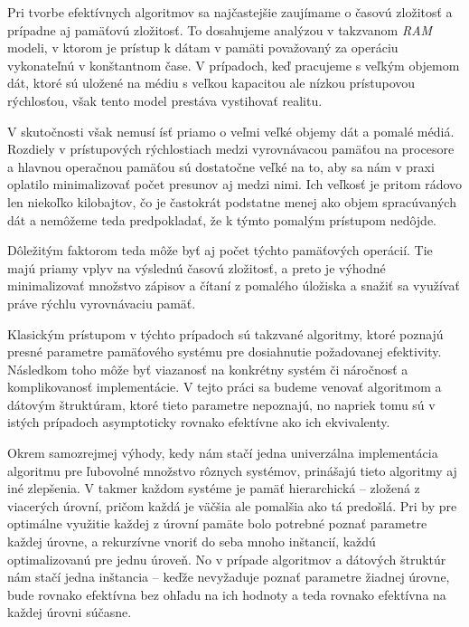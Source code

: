 
Pri tvorbe efektívnych algoritmov sa najčastejšie zaujímame o časovú zložitosť a prípadne aj pamäťovú zložitosť. To dosahujeme analýzou v takzvanom \emph{RAM} modeli, v ktorom je prístup k dátam v pamäti považovaný za operáciu vykonateľnú v konštantnom čase. V prípadoch, keď pracujeme s veľkým objemom dát, ktoré sú uložené na médiu s veľkou kapacitou ale nízkou prístupovou rýchlosťou, však tento model prestáva vystihovať realitu.

V skutočnosti však nemusí ísť priamo o veľmi veľké objemy dát a pomalé médiá. Rozdiely v prístupových rýchlostiach medzi vyrovnávacou pamäťou na procesore a hlavnou operačnou pamäťou sú dostatočne veľké na to, aby sa nám v praxi oplatilo minimalizovať počet presunov aj medzi nimi. Ich veľkosť je pritom rádovo len niekoľko kilobajtov, čo je častokrát podstatne menej ako objem spracúvaných dát a nemôžeme teda predpokladať, že k týmto pomalým prístupom nedôjde.

Dôležitým faktorom teda môže byť aj počet týchto pamäťových operácií. Tie majú priamy vplyv na výslednú časovú zložitosť, a preto je výhodné minimalizovať množstvo zápisov a čítaní z pomalého úložiska a snažiť sa využívať práve rýchlu vyrovnávaciu pamäť. 

Klasickým prístupom v týchto prípadoch sú takzvané \aware algoritmy, ktoré poznajú presné parametre pamäťového systému pre dosiahnutie požadovanej efektivity. Následkom toho môže byť viazanosť na konkrétny systém či náročnosť a komplikovanosť implementácie. V tejto práci sa budeme venovať \obliv algoritmom a dátovým štruktúram, ktoré tieto parametre nepoznajú, no napriek tomu sú v istých prípadoch asymptoticky rovnako efektívne ako ich \aware ekvivalenty.

Okrem samozrejmej výhody, kedy nám stačí jedna univerzálna implementácia algoritmu pre ľubovolné množstvo rôznych systémov, prinášajú tieto algoritmy aj iné zlepšenia. V takmer každom systéme je pamäť hierarchická -- zložená z viacerých úrovní, pričom každá je väčšia ale pomalšia ako tá predošlá. Pri \aware by pre optimálne využitie každej z úrovní pamäte bolo potrebné poznať parametre každej úrovne, a rekurzívne vnoriť do seba mnoho inštancií, každú optimalizovanú pre jednu úroveň. No v prípade \obliv algoritmov a dátových štruktúr nám stačí jedna inštancia -- keďže nevyžaduje poznať parametre žiadnej úrovne, bude rovnako efektívna bez ohľadu na ich hodnoty a teda rovnako efektívna na každej úrovni súčasne.

